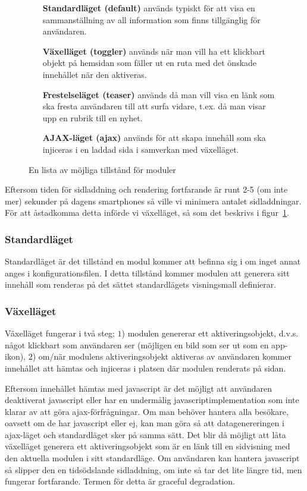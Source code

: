 \begin{figure}[h]
\begin{itemize}
  \item[{\bf Standardläget (default)}] används typiskt för att visa en
    sammanställning av all information som finns tillgänglig för användaren.
  \item[{\bf Växelläget (toggler)}] används när man vill ha ett klickbart objekt
    på hemsidan som fäller ut en ruta med det önskade innehållet när den
    aktiveras.
  \item[{\bf Frestelseläget (teaser)}] används då man vill visa en länk som ska
    fresta användaren till att surfa vidare, t.ex. då man visar upp en rubrik
    till en nyhet.
  \item[{\bf AJAX-läget (ajax)}] används för att skapa innehåll som ska
    injiceras i en laddad sida i samverkan med växelläget.
\end{itemize}
\caption{En lista av möjliga tillstånd för moduler\label{list:modes}}
\end{figure}

Eftersom tiden för sidladdning och rendering fortfarande är runt 2-5 (om inte
mer) sekunder på dagens smartphones så ville vi minimera antalet
sidladdningar. För att åstadkomma detta införde vi växelläget, så som det
beskrivs i figur~\ref{list:modes}.

\subsubsection{Standardläget}
Standardläget är det tillstånd en modul kommer att befinna sig i om inget annat
anges i konfigurationsfilen. I detta tillstånd kommer modulen att generera sitt
innehåll som renderas på det sättet standardlägets visningsmall definierar.

\subsubsection{Växelläget}
Växelläget fungerar i två steg;
$1$) modulen genererar ett aktiveringsobjekt, d.v.s. något klickbart som
användaren ser (möjligen en bild som ser ut som en app-ikon),
$2$) om/när modulens aktiveringsobjekt aktiveras av användaren kommer innehållet
att hämtas och injiceras i platsen där modulen renderats på sidan.

Eftersom innehållet hämtas med javascript är det möjligt att användaren
deaktiverat javascript eller har en undermålig javascriptimplementation som
inte klarar av att göra ajax-förfrågningar. Om man behöver hantera alla
besökare, oavsett om de har javascript eller ej, kan man göra så att
datagenereringen i ajax-läget och standardläget sker på samma sätt. Det blir då
möjligt att låta växelläget generera ett aktiveringsobjekt som är en länk till
en sidvisning med den aktuella modulen i sitt standardläge. Om användaren kan
hantera javascript så slipper den en tidsödslande sidladdning, om inte så tar
det lite längre tid, men fungerar fortfarande. Termen för detta är \dq
graceful degradation\dq.

